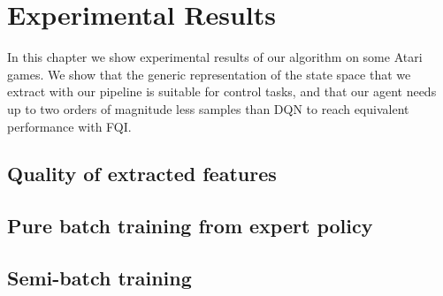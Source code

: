 \chapter{Experimental Results}
\label{chapter6_experiments}
\thispagestyle{empty}

\vspace{0.5cm}

In this chapter we show experimental results of our algorithm on some Atari
games.
We show that the generic representation of the state space that we extract with
our pipeline is suitable for control tasks, and that our agent needs up to two 
orders of magnitude less samples than DQN to reach equivalent performance with 
FQI. 


\section{Quality of extracted features}

\section{Pure batch training from expert policy}

\section{Semi-batch training}




